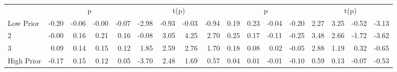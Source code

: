 \begin{table}[!ht]
\begin{tabular}{lrrrrrrrrrrrrrrrr}
  
     & \multicolumn{4}{c}{p} & \multicolumn{4}{c}{t(p)}  & \multicolumn{4}{c}{p} & \multicolumn{4}{c}{t(p)}   \\
     \cmidrule(r){2-5} \cmidrule(r){6-9}  \cmidrule(r){10-13} \cmidrule(r){14-17} 
    Low Prior  & -0.20  & -0.06  & -0.00  & -0.07  & -2.98  & -0.93  & -0.03  & -0.94  & 0.19  & 0.23  & -0.04  & -0.20  & 2.27  & 3.25  & -0.52  & -3.13   \\
    2  & -0.00  & 0.16  & 0.21  & 0.16  & -0.08  & 3.05  & 4.25  & 2.70  & 0.25  & 0.17  & -0.11  & -0.25  & 3.48  & 2.66  & -1.72  & -3.62   \\
    3  & 0.09  & 0.14  & 0.15  & 0.12  & 1.85  & 2.59  & 2.76  & 1.70  & 0.18  & 0.08  & 0.02  & -0.05  & 2.88  & 1.19  & 0.32  & -0.65   \\
    High Prior  & -0.17  & 0.15  & 0.12  & 0.05  & -3.70  & 2.48  & 1.69  & 0.57  & 0.04  & 0.01  & -0.01  & -0.10  & 0.59  & 0.13  & -0.07  & -0.53   \\
    
  
  \bottomrule
\end{tabular}
\label{tbl:32_Size_BMm_Prior_B16}
\end{table}